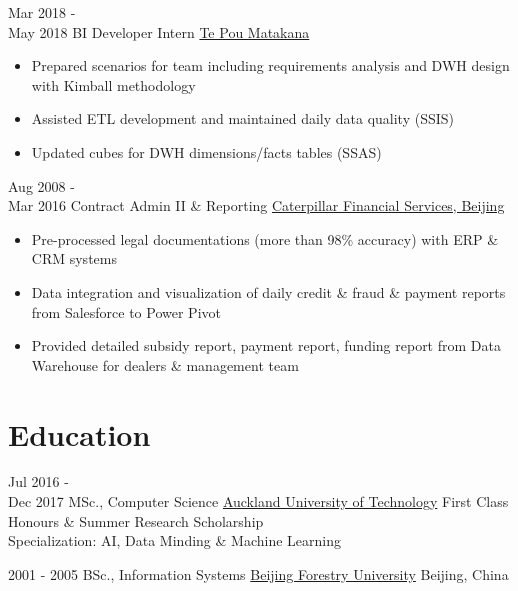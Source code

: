 \documentclass[letterpaper]{twentysecondcv} %
\begin{document}
\begin{twenty} %
        
    \twentyitem
   		{Mar 2018 - \\May 2018}
        {BI Developer Intern}
        {\href{https://www.tepoumatakana.com/}{Te Pou Matakana}}
        {}
        {
        {\begin{itemize}
       \item Prepared scenarios for team including requirements analysis and DWH design with Kimball methodology
       \item Assisted ETL development and maintained daily data quality (SSIS)
       \item Updated cubes for DWH dimensions/facts tables (SSAS)


    \end{itemize}}
        }
	\twentyitem
    	{Aug 2008 - \\Mar 2016}
        {Contract Admin II \& Reporting}
        {\href{http://www.caterpillar.com/}{Caterpillar Financial Services, Beijing}}
        {}
        {
        {\begin{itemize}
        \item Pre-processed legal documentations (more than 98\% accuracy) with ERP \& CRM systems
        \item Data integration and visualization of daily credit \& fraud \& payment reports from Salesforce to Power Pivot
        \item Provided detailed subsidy report, payment report, funding report from Data Warehouse for dealers \& management team   
    \end{itemize}}
        }
\end{twenty}

\section{Education}

\begin{twenty} %
	\twentyitem
    	{Jul 2016 - \\ Dec 2017}
        {MSc., Computer Science}
        {\href{http://www.aut.ac.nz/}{Auckland University of Technology}}
        {First Class Honours \& Summer Research Scholarship \\Specialization: AI, Data Minding \& Machine Learning}
        
	\twentyitem
    	{2001 - 2005}
        {BSc., Information Systems}
        {\href{http://www.bjfu.edu.cn/}{Beijing Forestry University}}
        {Beijing, China}    
        
\end{twenty}
\end{document}
